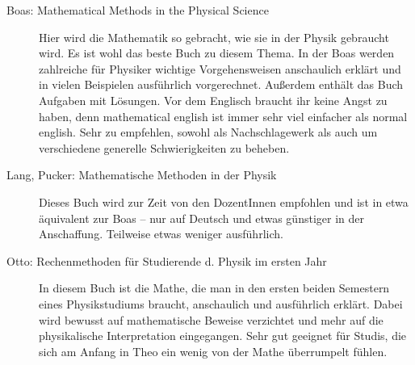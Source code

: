 \begin{description}
\item[Boas: Mathematical Methods in the Physical Science]{
		Hier wird die Mathematik so gebracht, wie sie in der Physik gebraucht wird. Es ist wohl das beste Buch zu diesem Thema. In der Boas werden zahlreiche für Physiker wichtige Vorgehensweisen anschaulich erklärt und in vielen Beispielen ausführlich vorgerechnet. Außerdem enthält das Buch Aufgaben mit Lösungen. Vor dem Englisch braucht ihr keine Angst zu haben, denn mathematical english ist immer sehr viel einfacher als normal english. Sehr zu empfehlen, sowohl als Nachschlagewerk als auch um verschiedene generelle Schwierigkeiten zu beheben.}

\item[Lang, Pucker: Mathematische Methoden in der Physik]{
		Dieses Buch wird zur Zeit von den DozentInnen empfohlen und ist in etwa äquivalent zur Boas -- nur auf Deutsch und etwas günstiger in der Anschaffung. Teilweise etwas weniger ausführlich.}

\item[Otto: Rechenmethoden für Studierende d. Physik im ersten Jahr]{
		In diesem Buch ist die Mathe, die man in den ersten beiden Semestern eines Physikstudiums braucht, anschaulich und ausführlich erklärt. Dabei wird bewusst auf mathematische Beweise verzichtet und mehr auf die physikalische Interpretation eingegangen. Sehr gut geeignet für Studis, die sich am Anfang in Theo ein wenig von der Mathe überrumpelt fühlen.}
\end{description}

